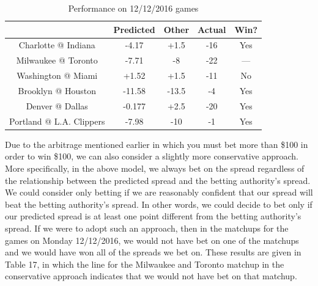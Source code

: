 \documentclass{article}
\begin{document}
\begin{table}
  \begin{center}
    \begin{tabular}{ | c | c | c | c | c | }
      \hline
                                & Predicted     & Other  & Actual & Win?  \\ \hline
      Charlotte @ Indiana       & -4.17         & +1.5   & -16    & Yes   \\ \hline
      Milwaukee @ Toronto       & -7.71         & -8     & -22    & ---   \\ \hline
      Washington @ Miami        & +1.52         & +1.5   & -11    & No    \\ \hline
      Brooklyn @ Houston        & -11.58         & -13.5  & -4     & Yes   \\ \hline
      Denver @ Dallas           & -0.177         & +2.5   & -20    & Yes   \\ \hline
      Portland @ L.A. Clippers  & -7.98         & -10    & -1     & Yes   \\ \hline
    \end{tabular}
  \end{center}
  \caption{Performance on 12/12/2016 games}
\end{table}


Due to the arbitrage mentioned earlier in which you must bet more than \$100 in order to win \$100, we can also consider a slightly more conservative approach. More specifically, in the above model, we always bet on the spread regardless of the relationship between the predicted spread and the betting authority's spread. We could consider only betting if we are reasonably confident that our spread will beat the betting authority's spread. In other words, we could decide to bet only if our predicted spread is at least one point different from the betting authority's spread. If we were to adopt such an approach, then in the matchups for the games on Monday 12/12/2016, we would not have bet on one of the matchups and we would have won all of the spreads we bet on. These results are given in Table 17, in which the line for the Milwaukee and Toronto matchup in the conservative approach indicates that we would not have bet on that matchup.
\end{document}
